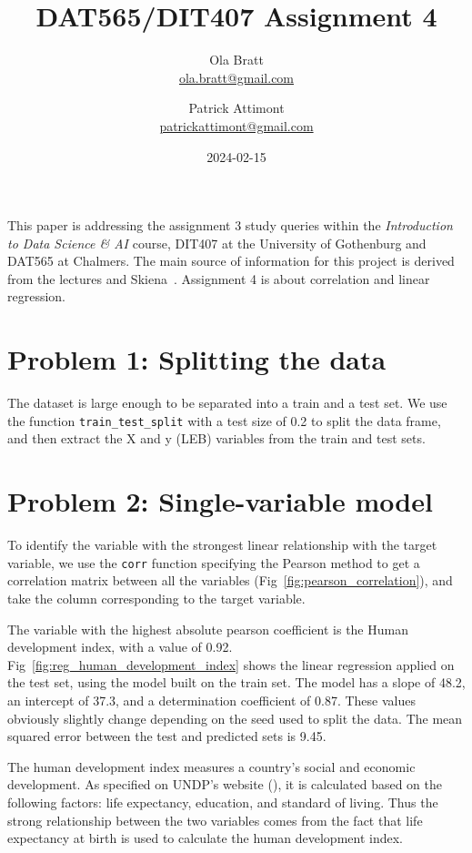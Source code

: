 \documentclass[a4paper]{article}
\begin{document}
\author{Ola Bratt \\
  \href{mailto:ola.bratt@gmail.com}{ola.bratt@gmail.com}
  \and
  Patrick Attimont \\
  \href{patrickattimont@gmail.com}{patrickattimont@gmail.com}
}

\title{DAT565/DIT407 Assignment 4}
\date{2024-02-15}

\maketitle

This paper is addressing the assignment 3 study queries within the \emph{Introduction to Data Science \& AI} course, DIT407 at 
the University of Gothenburg and DAT565 at Chalmers. The main source of information for this project
is derived from the lectures and Skiena~\cite{Skiena:2024}. Assignment 4 is about correlation and linear regression.

\section*{Problem 1: Splitting the data}
The dataset is large enough to be separated into a train and a test set. We use the function \verb|train_test_split| with a test size of 0.2 to split the data frame, and then extract the X and y (LEB) variables from the train and test sets.


\section*{Problem 2: Single-variable model}
To identify the variable with the strongest linear relationship with the target variable, we use the \verb|corr| function specifying the Pearson method to get a correlation matrix between all the variables (Fig~\ref{fig:pearson_correlation}), and take the column corresponding to the target variable.

The variable with the highest absolute pearson coefficient is the Human development index, with a value of 0.92.
Fig~\ref{fig:reg_human_development_index} shows the linear regression applied on the test set, using the model built on the train set.
The model has a slope of 48.2, an intercept of 37.3, and a determination coefficient of 0.87. These values obviously slightly change depending on the seed used to split the data.
The mean squared error between the test and predicted sets is 9.45.

The human development index measures a country's social and economic development. As specified on UNDP's website (\cite{UNDP:2023}), it is calculated based on the following factors: life expectancy, education, and standard of living.
Thus the strong relationship between the two variables comes from the fact that life expectancy at birth is used to calculate the human development index.
\end{document}
